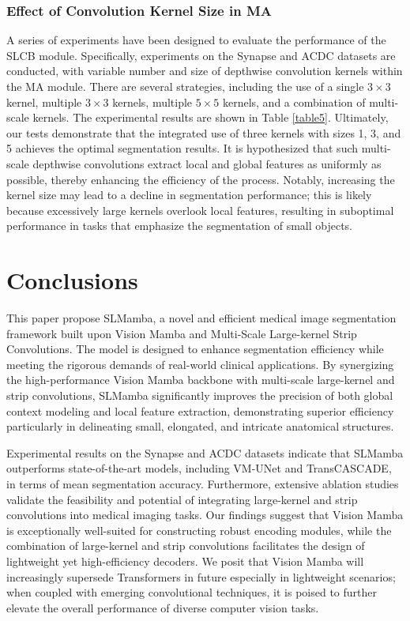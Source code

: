 \documentclass[runningheads]{llncs}
\begin{document}
\subsubsection{Effect of Convolution Kernel Size in MA}

A series of experiments have been designed to evaluate the performance of the SLCB module. Specifically, experiments on the Synapse and ACDC datasets are conducted, with variable number and size of depthwise convolution kernels within the MA module. There are several strategies, including the use of a single $3 \times 3$ kernel, multiple $3 \times 3$ kernels, multiple $5 \times 5$ kernels, and a combination of multi-scale kernels. The experimental results are shown in Table \textcolor{red}{\ref{table5}}. Ultimately, our tests demonstrate that the integrated use of three kernels with sizes 1, 3, and 5 achieves the optimal segmentation results. It is hypothesized that such multi-scale depthwise convolutions extract local and global features as uniformly as possible, thereby enhancing the efficiency of the process. Notably, increasing the kernel size may lead to a decline in segmentation performance; this is likely because excessively large kernels overlook local features, resulting in suboptimal performance in tasks that emphasize the segmentation of small objects.






\section{Conclusions}

This paper propose SLMamba, a novel and efficient medical image segmentation framework built upon Vision Mamba and Multi-Scale Large-kernel Strip Convolutions. The model is designed to enhance segmentation efficiency while meeting the rigorous demands of real-world clinical applications. By synergizing the high-performance Vision Mamba backbone with multi-scale large-kernel and strip convolutions, SLMamba significantly improves the precision of both global context modeling and local feature extraction, demonstrating superior efficiency particularly in delineating small, elongated, and intricate anatomical structures.

Experimental results on the Synapse and ACDC datasets indicate that SLMamba outperforms state-of-the-art models, including VM-UNet and TransCASCADE, in terms of mean segmentation accuracy. Furthermore, extensive ablation studies validate the feasibility and potential of integrating large-kernel and strip convolutions into medical imaging tasks. Our findings suggest that Vision Mamba is exceptionally well-suited for constructing robust encoding modules, while the combination of large-kernel and strip convolutions facilitates the design of lightweight yet high-efficiency decoders. We posit that Vision Mamba will increasingly supersede Transformers in future especially in lightweight scenarios; when coupled with emerging convolutional techniques, it is poised to further elevate the overall performance of diverse computer vision tasks.
\end{document}
